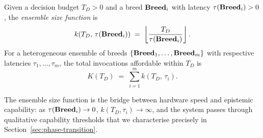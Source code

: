 \begin{definition}
\label{def:ensemble-size}
Given a decision budget $T_D > 0$ and a breed $\mathbf{Breed}_i$ with latency
$\tau(\mathbf{Breed}_i) > 0$, the \emph{ensemble size function} is
\[
  k(T_D,\, \tau(\mathbf{Breed}_i)) \;=\; \left\lfloor \frac{T_D}{\tau(\mathbf{Breed}_i)} \right\rfloor.
\]
For a heterogeneous ensemble of breeds $\{\mathbf{Breed}_1, \ldots, \mathbf{Breed}_m\}$ with respective
latencies $\tau_1, \ldots, \tau_m$, the total invocations affordable within $T_D$ is
\[
  K(T_D) \;=\; \sum_{i=1}^{m} k(T_D,\, \tau_i).
\]
\end{definition}

The ensemble size function is the bridge between hardware speed and epistemic capability:
as $\tau(\mathbf{Breed}_i) \to 0$, $k(T_D, \tau_i) \to \infty$, and the system passes through
qualitative capability thresholds that we characterise precisely in
Section~\ref{sec:phase-transition}.

